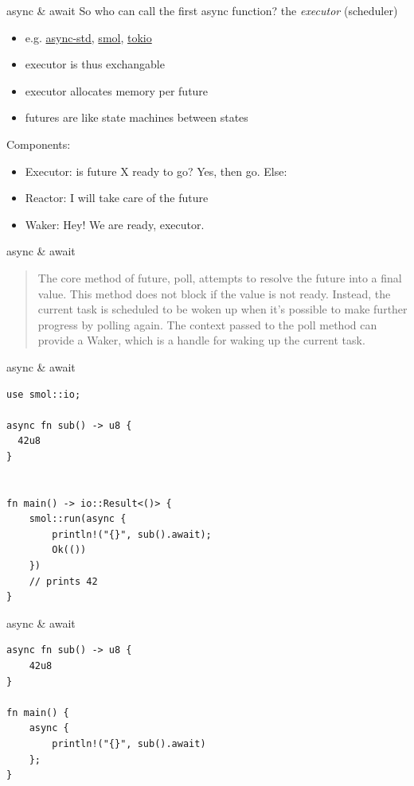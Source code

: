 \documentclass{beamer}
\begin{document}
\begin{frame}[fragile]{async \& await}
  So who can call the first async function? the \emph{executor} (scheduler)
  \begin{itemize}
    \item e.g. \href{https://crates.io/crates/async-std}{async-std}, \href{https://crates.io/crates/smol}{smol}, \href{https://crates.io/crates/tokio}{tokio}
    \item executor is thus exchangable
    \item executor allocates memory per future
    \item futures are like state machines between states
  \end{itemize}
  Components:
  \begin{itemize}
    \item Executor: is future X ready to go? Yes, then go. Else:
    \item Reactor: I will take care of the future
    \item Waker: Hey! We are ready, executor.
  \end{itemize}
\end{frame}

\begin{frame}[fragile]{async \& await}
  \begin{quote}
    The core method of future, poll, attempts to resolve the future into a final value. This method does not block if the value is not ready. Instead, the current task is scheduled to be woken up when it's possible to make further progress by polling again. The context passed to the poll method can provide a Waker, which is a handle for waking up the current task.
  \end{quote}
\end{frame}

\begin{frame}[fragile]{async \& await}
  \begin{verbatim}
use smol::io;
  
async fn sub() -> u8 {
  42u8
}


fn main() -> io::Result<()> {
    smol::run(async {
        println!("{}", sub().await);
        Ok(())
    })
    // prints 42
}
  \end{verbatim}
\end{frame}

\begin{frame}[fragile]{async \& await}
  \begin{verbatim}
async fn sub() -> u8 {
    42u8
}

fn main() {
    async {
        println!("{}", sub().await)
    };
}
  \end{verbatim}
\end{frame}
\end{document}
